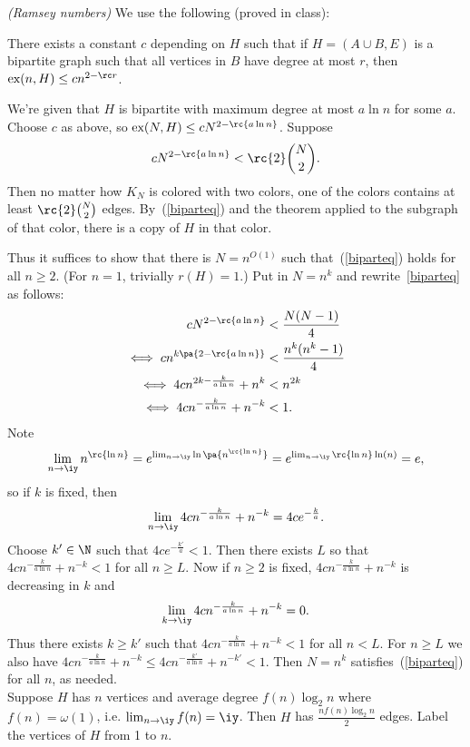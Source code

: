 \begin{problem} {\it (Ramsey numbers)}
We use the following (proved in class):
\begin{thm}
There exists a constant $c$ depending on $H$ such that if $H=(A\cup B,E)$ is a bipartite graph such that all vertices in $B$ have degree at most $r$, then $\text{ex}(n,H)\le cn^{2-\rc r}$. 
\end{thm}
We're given that $H$ is bipartite with maximum degree at most $a\ln n$ for some $a$. Choose $c$ as above, so $\text{ex}(N,H)\le cN^{2-\rc {a\ln n}}$.  Suppose 
\begin{equation}\label{biparteq}
cN^{2-\rc {a\ln n}}<\rc{2}\binom N2.
\end{equation}
Then no matter how $K_N$ is colored with two colors, one of the colors contains at least $\rc{2}\binom N2$ edges. By~(\ref{biparteq}) and the theorem applied to the subgraph of that color, there is a copy of $H$ in that color.

Thus it suffices to show that there is $N=n^{O(1)}$ such that~(\ref{biparteq}) holds for all $n\ge 2$. (For $n=1$, trivially $r(H)=1$.) Put in $N=n^k$ and rewrite~\ref{biparteq} as follows:
\begin{align*}
cN^{2-\rc{a\ln n}}&<\frac{N(N-1)}{4}\\
\iff cn^{k\pa{2-\rc{a\ln n}}}&<\frac{n^k(n^k-1)}{4}\\
\iff 4cn^{2k-\frac{k}{a\ln n}}+{n^k}&<n^{2k}\\
\iff 4cn^{-\frac {k}{a\ln n}}+n^{-k}&<1.
\end{align*}
Note
\[\lim_{n\to \iy} n^{\rc{\ln n}}=e^{\lim_{n\to \iy} \ln \pa{n^{\rc{\ln n}}}}
=e^{\lim_{n\to \iy} \rc{\ln n}\ln (n)}
=e,\]
so if $k$ is fixed, then
\[
\lim_{n\to \iy} 4cn^{-\frac{k}{a\ln n}}+n^{-k}=4ce^{-\frac k{a}}.
\]
Choose $k'\in \N$ such that $4ce^{-\frac {k'}{a}}<1$. Then there exists $L$ so that $4cn^{-\frac{k}{a\ln n}}+n^{-k}<1$ for all $n\ge L$. Now if $n\ge 2$ is fixed, $4cn^{-\frac{k}{a\ln n}}+n^{-k}$ is decreasing in $k$ and 
\[
\lim_{k\to \iy} 4cn^{-\frac{k}{a\ln n}}+n^{-k}=0.
\]
Thus there exists $k\ge k'$ such that $4cn^{-\frac{k}{a\ln n}}+n^{-k}<1$ for all $n<L$. For $n\ge L$ we also have $4cn^{-\frac{k}{a\ln n}}+n^{-k}\le 4cn^{-\frac{k'}{a\ln n}}+n^{-k'}<1$. Then $N=n^k$ satisfies~(\ref{biparteq}) for all $n$, as needed.\\

Suppose $H$ has $n$ vertices and average degree $f(n)\log_2 n$ where $f(n)=\omega(1)$, i.e. $\lim_{n\to \iy}f(n)=\iy$. Then $H$ has $\frac{nf(n)\log_2 n}{2}$ edges. Label the vertices of $H$ from 1 to $n$.


\end{problem}
